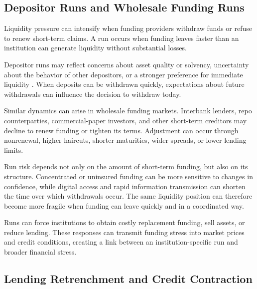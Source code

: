 \subsection{Depositor Runs and Wholesale Funding Runs}

Liquidity pressure can intensify when funding providers withdraw funds or refuse to renew short-term claims. A run occurs when funding leaves faster than an institution can generate liquidity without substantial losses.

Depositor runs may reflect concerns about asset quality or solvency, uncertainty about the behavior of other depositors, or a stronger preference for immediate liquidity \cite{DiamondDybvig1983}. When deposits can be withdrawn quickly, expectations about future withdrawals can influence the decision to withdraw today.

Similar dynamics can arise in wholesale funding markets. Interbank lenders, repo counterparties, commercial-paper investors, and other short-term creditors may decline to renew funding or tighten its terms. Adjustment can occur through nonrenewal, higher haircuts, shorter maturities, wider spreads, or lower lending limits.

\begin{tcolorbox}[
  enhanced,
  breakable,
  colback=white,
  colframe=FinanceBlue,
  boxrule=0.7pt,
  sharp corners,
  borderline west={2.2pt}{0pt}{FinanceBlue},
  title=\textbf{Financial Perspective: Funding Structure Shapes Run Risk},
  coltitle=white,
  colbacktitle=FinanceBlue,
  fonttitle=\bfseries,
  before skip=1.2em,
  after skip=1.2em
]

Run risk depends not only on the amount of short-term funding, but also on its structure. Concentrated or uninsured funding can be more sensitive to changes in confidence, while digital access and rapid information transmission can shorten the time over which withdrawals occur. The same liquidity position can therefore become more fragile when funding can leave quickly and in a coordinated way.

\end{tcolorbox}

Runs can force institutions to obtain costly replacement funding, sell assets, or reduce lending. These responses can transmit funding stress into market prices and credit conditions, creating a link between an institution-specific run and broader financial stress.

\subsection{Lending Retrenchment and Credit Contraction}

